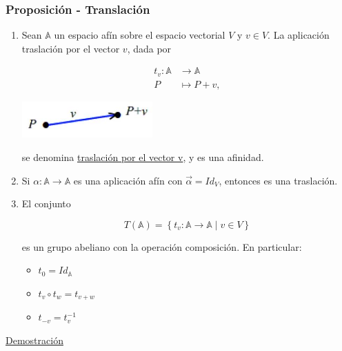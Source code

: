 \documentclass[12pt, a4paper, ones, notitlepage, openany,titlepage]{article}
\newcommand{\demostracion}{\noindent\underline{Demostración}}
\begin{document}
\subsubsection{Proposición - Translación}
\begin{enumerate}[label=(\arabic*)]
\item Sean $\mathbb{A}$ un espacio afín sobre el espacio vectorial $V$ y $v \in V$. La aplicación traslación por el vector $v$, dada por

$$
\begin{aligned}
t_{v}: \mathbb{A} & \longrightarrow \mathbb{A} \\
P & \longmapsto P+v,
\end{aligned}
$$

\begin{center}
\includegraphics[max width=5cm]{2023_03_01_7659aec5e35f9a9b2d3cg-22}
\end{center}

se denomina \underline{traslación por el vector v}, y es una afinidad.

\item Si $\alpha:\mathbb{A}\longrightarrow\mathbb{A}$ es una aplicación afín con $\overrightarrow{\alpha}=Id_{V}$, entonces es una traslación.

\item El conjunto

$$
T(\mathbb{A})=\left\{t_{v}: \mathbb{A} \rightarrow \mathbb{A} \mid v \in V\right\}
$$

es un grupo abeliano con la operación composición. En particular:
\begin{itemize}
\item $t_{0} = Id_{\mathbb{A}}$
\item $t_{v}\circ t_{w} = t_{v+w}$
\item $t_{-v} = t_{v}^{-1}$
\end{itemize}

\end{enumerate}
\demostracion
\end{document}
